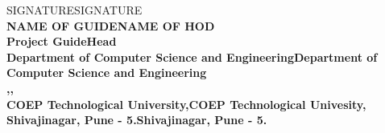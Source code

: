 \begin{center}		%

SIGNATURESIGNATURE\\
\normalsize{\bf{NAME OF GUIDENAME OF HOD\\
Project GuideHead}\\
Department of Computer Science and EngineeringDepartment of Computer Science and Engineering\\,,\\
COEP Technological University,COEP Technological Univesity,\\
Shivajinagar, Pune - 5.Shivajinagar, Pune - 5.}
\end{center}

